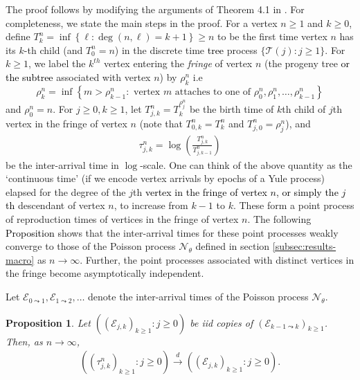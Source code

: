 \documentclass[letterpaper,11pt,reqno]{amsart}
\newtheorem{prop}[thm]{Proposition}
\theoremstyle{definition}
\renewcommand{\ge}{\geqslant}
\renewcommand{\geq}{\geqslant}
\newcommand{\set}[1]{\left\{#1\right\}}
\newcommand{\sE}{\mathscr{E}}
\newcommand{\TT}{\mathcal{T}}
\newcommand{\convd}{\stackrel{d}{\longrightarrow}}
\begin{document}
 The %
  proof follows by modifying the arguments of Theorem 4.1 in \cite{BBDS04_macro}. For completeness, we state the main steps in the proof. For a vertex $n\geq 1$ and $k\geq 0$, define $T_k^n = \inf\set{\ell: \deg(n,\ell) = k+1}\geq n$ to be the first time vertex $n$ has its $k$-th child (and $T_0^n = n$) in the discrete time \textcolor{black}{tree} process $\{\TT(j) : j \ge 1\}$. For $k\geq 1$, we label the $k^{th}$ vertex entering the \emph{fringe} of vertex $n$ (the progeny tree \textcolor{black}{or the subtree} associated with vertex $n$) by $\rho_k^n$ i.e \begin{equation*}
    \rho_k^n = \inf\set{m> \rho_{k-1}^n: \text{ vertex }m \text{ attaches to one of } \rho_0^n,\rho_1^n,\dots, \rho_{k-1}^n}\end{equation*}  and $\rho_0^n = n$. For $j\geq 0,k\geq 1$, let $T^n_{j,k} = T^{\rho_j^n}_k$ be the birth time of $k$th child of $j$th vertex in the fringe of vertex $n$ (note that $T^n_{0,k} = T^n_k$ and $T^n_{j,0} = \rho^n_j$), and  \begin{align*}
    \tau_{j,k}^n = \log\left(\frac{T^n_{j,k}}{T^n_{j,k-1}}\right)
\end{align*}be the inter-arrival time in $\log$-scale.
One can think of the above quantity as the `continuous time' (if we encode vertex arrivals by epochs of a Yule process) elapsed for the degree of the $j$th \textcolor{black}{vertex in the fringe of vertex $n$, or simply the $j$th} descendant of vertex $n$, to increase from $k-1$ to $k$. These form a point process of reproduction times of vertices in the fringe of vertex $n$. The following \textcolor{black}{Proposition} shows that the inter-arrival times for these point processes weakly converge to those of the Poisson process $\mathcal{N}_\theta$ defined in section \ref{subsec:results-macro} as $n \to \infty$. Further, the point processes associated with distinct vertices in the fringe become asymptotically independent.

Let $\sE_{0\leadsto 1},\sE_{1\leadsto 2},\dots $ denote the inter-arrival times of the Poisson process $\mathcal{N}_{\theta}$.

\begin{prop}\label{prop:degree-times-n} 
Let $\left(\left(\sE_{j,k}\right)_{k\geq 1}: j\geq 0\right)$ be \emph{iid} copies of $\left(\sE_{k-1\leadsto k}\right)_{k\geq 1}$. Then, as $n \to \infty$,\begin{align*}
 \left(\left(\tau_{j,k}^n\right)_{k\geq 1}: j\geq 0\right) \convd \left(\left(\sE_{j,k}\right)_{k\geq 1}: j\geq 0\right).
\end{align*}
\end{prop}
\end{document}

